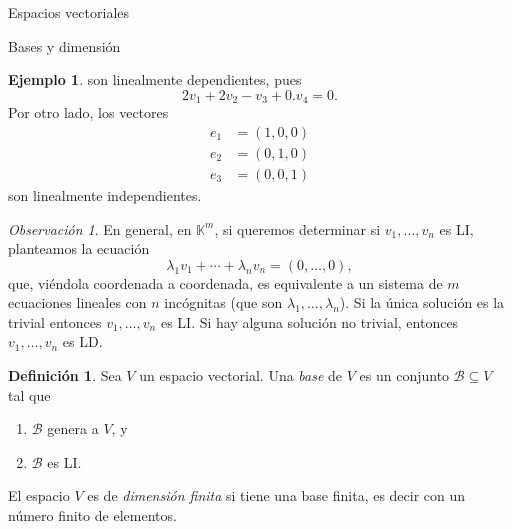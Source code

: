 \documentclass[a4paper,12pt,twoside,spanish]{amsbook}
\theoremstyle{definition}
\newtheorem{definicion}{Definici\'on}[section]
\newtheorem{ejemplo}{Ejemplo}[section]
\theoremstyle{remark}
\newtheorem{observacion}{Observaci\'on}[section]
\newcommand{\K}{\mathbb K}
\begin{document}
\begin{chapter}{Espacios vectoriales}
\begin{section}{Bases y dimensión}
\begin{ejemplo}
	son linealmente dependientes, pues
	$$
	2v_1+2v_2 -v_3 +0.v_4 =0.
	$$
	Por otro lado, los vectores
	\begin{align*}
	e_1 &= (1,0,0) \\
	e_2 &= (0,1,0) \\
	e_3 &= (0,0,1) 
	\end{align*}
	son linealmente independientes.
\end{ejemplo}


\begin{observacion}
	En  general,  en $\K^m$, si queremos determinar si  $v_1,\ldots,v_n$ es LI, planteamos la ecuación  
	\begin{equation*}
	\lambda_1v_1+\cdots+\lambda_nv_n=(0,\ldots,0),
	\end{equation*}
	que, viéndola coordenada a coordenada, es equivalente a un sistema de $m$ ecuaciones lineales con  $n$ incógnitas (que son $\lambda_1,\ldots,\lambda_n$). Si  la única solución es la trivial entonces $v_1,\ldots,v_n$ es LI. Si hay alguna solución no trivial, entonces $v_1,\ldots,v_n$ es LD. 
\end{observacion}
 
 \begin{definicion}
 	Sea $V$ un espacio vectorial. Una \textit{base} de $V$ es un conjunto $\mathcal B \subseteq V$ tal que
 	\begin{enumerate}
 		\item $\mathcal B$ genera a $V$, y
 		\item $\mathcal B$ es LI.
 	\end{enumerate}
 	 El espacio $V$ es de \textit{dimensión finita} si tiene una base finita,  es decir con  un número finito de elementos.
 \end{definicion}




\end{section}
\end{chapter}
\end{document}
